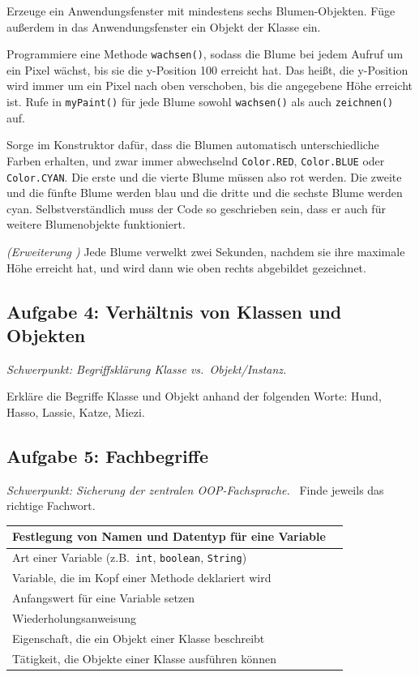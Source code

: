 \begin{compactenum}[a)]
\item Erzeuge ein Anwendungsfenster mit mindestens sechs Blumen-Objekten. Füge
außerdem in das Anwendungsfenster ein Objekt der Klasse  ein.

\item Programmiere eine Methode \lstinline|wachsen()|, sodass die Blume bei jedem
Aufruf um ein Pixel wächst, bis sie die y-Position 100 erreicht hat. Das heißt,
die y-Position wird immer um ein Pixel nach oben verschoben, bis die angegebene
Höhe erreicht ist. Rufe in \lstinline|myPaint()| für jede Blume sowohl \lstinline|wachsen()| 
als auch \lstinline|zeichnen()| auf.

\item Sorge im Konstruktor dafür, dass die Blumen automatisch unterschiedliche
Farben erhalten, und zwar immer abwechselnd \lstinline|Color.RED|,
\lstinline|Color.BLUE| oder \lstinline|Color.CYAN|. Die erste und die vierte
Blume müssen also rot werden. Die zweite und die fünfte Blume werden blau und
die dritte und die sechste Blume werden cyan. Selbstverständlich muss der Code
so geschrieben sein, dass er auch für weitere Blumenobjekte funktioniert.

\item \emph{(Erweiterung \tagLK)} Jede Blume verwelkt zwei Sekunden, nachdem sie ihre 
maximale Höhe erreicht hat, und wird dann wie oben rechts abgebildet gezeichnet.
\end{compactenum}


\subsection{Aufgabe 4: Verhältnis von Klassen und Objekten \tagPflicht}
\noindent \emph{Schwerpunkt: Begriffsklärung Klasse vs.\ Objekt/Instanz.}

Erkläre die Begriffe Klasse und Objekt anhand der folgenden Worte: Hund, Hasso,
Lassie, Katze, Miezi.


\subsection{Aufgabe 5: Fachbegriffe \tagPflicht}
\noindent \emph{Schwerpunkt: Sicherung der zentralen OOP-Fachsprache.}
\
Finde jeweils das richtige Fachwort.

\bgroup
\def\arraystretch{1.2}
\begin{tabular}{|l|p{65mm}|}
\hline
Festlegung von Namen und Datentyp für eine Variable & \\ \hline
Art einer Variable (z.B.\ \lstinline|int|, \lstinline|boolean|, \lstinline|String|) & \\ \hline
Variable, die im Kopf einer Methode deklariert wird & \\ \hline
Anfangswert für eine Variable setzen & \\ \hline
Wiederholungsanweisung & \\ \hline
Eigenschaft, die ein Objekt einer Klasse beschreibt & \\ \hline
Tätigkeit, die Objekte einer Klasse ausführen können & \\ \hline
\end{tabular}
\egroup


